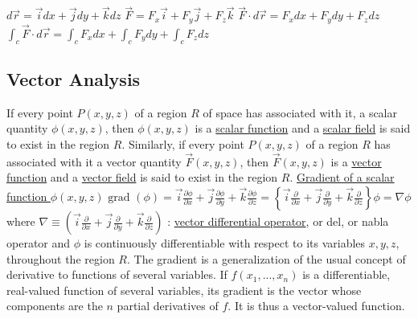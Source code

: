 \documentclass[12pt]{article}
\def\grad{\text{grad\ }} %
\begin{document}
\begin{flushleft}
	\textbullet \quad $ d\vec{r} = \vec{i} dx + \vec{j} dy + \vec{k} dz $ \linebreak 
	\textbullet \quad $ \vec{F} = F_x \vec{i} + F_y \vec{j} + F_z \vec{k} $ \linebreak 
	\textbullet \quad $ \vec{F} \cdot d\vec{r} = F_x dx + F_y dy + F_z dz $ \linebreak 
	\textbullet \quad $ \int_c \vec{F} \cdot d\vec{r} = \int_c F_x dx + \int_c F_y dy + \int_c F_z dz $ \linebreak 
	
	\subsection{Vector Analysis} 
	
	\textbullet \quad If every point $P(x,y,z)$ of a region $R$ of space has associated with it, a scalar quantity $\phi (x,y,z)$, then $\phi (x,y,z)$ is a \uline{scalar function} and a \uline{scalar field} is said to exist in the region $R$. \linebreak 
	\textbullet \quad Similarly, if every point $P(x,y,z)$ of a region $R$ has associated with it a vector quantity $\vec{F} (x,y,z)$, then $\vec{F} (x,y,z)$ is a \uline{vector function} and a \uline{vector field} is said to exist in the region $R$. \linebreak 
	\textbullet \quad \uline{Gradient of a scalar function $\phi (x,y,z)$} \linebreak 
	$\displaystyle \grad (\phi) = \vec{i} \frac{\partial \phi}{\partial x} + \vec{j} \frac{\partial \phi}{\partial y} + \vec{k} \frac{\partial \phi}{\partial z} = \left\{ \vec{i} \frac{\partial}{\partial x} + \vec{j} \frac{\partial}{\partial y} + \vec{k} \frac{\partial}{\partial z} \right\} \phi = \nabla \phi $ \linebreak 
	where $\nabla \equiv \left( \vec{i} \frac{\partial}{\partial x} + \vec{j} \frac{\partial}{\partial y} + \vec{k} \frac{\partial}{\partial z} \right) $  :  \uline{vector differential operator}, or del, or nabla operator \linebreak 
	and $\phi$ is continuously differentiable with respect to its variables $x,y,z$, throughout the region $R$. \linebreak 
	The gradient is a generalization of the usual concept of derivative to functions of several variables. If $f(x_1, ..., x_n)$ is a differentiable, real-valued function of several variables, its gradient is the vector whose components are the $n$ partial derivatives of $f$. It is thus a vector-valued function. \linebreak 

\end{flushleft}
\end{document}
